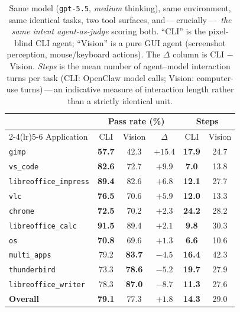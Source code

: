\documentclass{llmxive}
\providecommand{\cliOswIntent}{79.1}
\providecommand{\cuaVisionIntent}{77.3}
\providecommand{\cliOswSteps}{14.3}
\providecommand{\cuaVisionSteps}{29.0}
\begin{document}
\begin{table}[t]
\centering\small
\begin{tabular}{lccccc}
\toprule
& \multicolumn{3}{c}{Pass rate (\%)} & \multicolumn{2}{c}{Steps} \\
\cmidrule(lr){2-4}\cmidrule(lr){5-6}
Application & CLI & Vision & $\Delta$ & CLI & Vision \\
\midrule
\texttt{gimp}                 & \textbf{57.7} & 42.3 & $+15.4$ & \textbf{17.9} & 24.7 \\
\texttt{vs\_code}             & \textbf{82.6} & 72.7 & $+9.9$  & \textbf{7.0}  & 13.8 \\
\texttt{libreoffice\_impress} & \textbf{89.4} & 82.6 & $+6.8$  & \textbf{12.1} & 27.7 \\
\texttt{vlc}                  & \textbf{76.5} & 70.6 & $+5.9$  & \textbf{12.0} & 13.3 \\
\texttt{chrome}               & \textbf{72.5} & 70.2 & $+2.3$  & \textbf{24.2} & 28.2 \\
\texttt{libreoffice\_calc}    & \textbf{91.5} & 89.4 & $+2.1$  & \textbf{9.8}  & 30.3 \\
\texttt{os}                   & \textbf{70.8} & 69.6 & $+1.3$  & \textbf{6.6}  & 10.6 \\
\texttt{multi\_apps}          & 79.2 & \textbf{83.7} & $-4.5$  & \textbf{16.4} & 42.3 \\
\texttt{thunderbird}          & 73.3 & \textbf{78.6} & $-5.2$  & \textbf{19.7} & 27.9 \\
\texttt{libreoffice\_writer}  & 78.3 & \textbf{87.0} & $-8.7$  & \textbf{11.3} & 27.6 \\
\midrule
\textbf{Overall} & \textbf{\cliOswIntent} & \cuaVisionIntent & $+1.8$ & \textbf{\cliOswSteps} & \cuaVisionSteps \\
\bottomrule
\end{tabular}
\caption{Same model (\texttt{gpt-5.5}, \emph{medium} thinking), same
environment, same identical tasks, two tool surfaces, and\,---\,crucially\,---\,%
\emph{the same intent agent-as-judge} scoring both. ``CLI'' is the pixel-blind
CLI agent; ``Vision'' is a pure GUI agent (screenshot perception,
mouse/keyboard actions). The $\Delta$ column is CLI $-$ Vision.
\emph{Steps} is the mean number of agent--model interaction turns per task
(CLI: OpenClaw model calls; Vision: computer-use turns)\,---\,an indicative
measure of interaction length rather than a strictly identical unit.}
\label{tab:cli-vs-vision}
\end{table}
\end{document}
